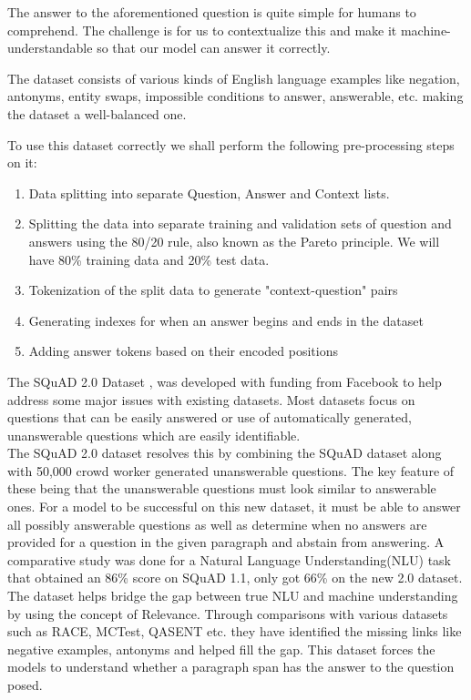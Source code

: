 \documentclass[a4paper,12pt]{report}
\begin{document}
	    The answer to the aforementioned question is quite simple for humans to comprehend. The challenge is for us to contextualize this and make it machine-understandable so that our model can answer it correctly.

	    The dataset consists of various kinds of English language examples like negation, antonyms, entity swaps, impossible conditions to answer, answerable, etc. making the dataset a well-balanced one.

	    To use this dataset correctly we shall perform the following pre-processing steps on it:

	    \begin{enumerate}
	    	\item Data splitting into separate Question, Answer and Context lists.
	    	\item Splitting the data into separate training and validation sets of  question and answers using the 80/20 rule, also known as the Pareto principle. We will have 80\% training data and 20\% test data.
	    	\item Tokenization of the split data to generate "context-question" pairs
	    	\item Generating indexes for when an answer begins and ends in the dataset
	    	\item Adding answer tokens based on their encoded positions
	    \end{enumerate}

        The SQuAD 2.0 Dataset \citep{dataset}, was developed with funding from Facebook to help address some major issues with existing datasets. Most datasets focus on questions that can be easily answered or use of    automatically generated, unanswerable questions which are easily identifiable.\\
        The SQuAD 2.0 dataset resolves this by combining the SQuAD dataset along with 50,000 crowd worker generated unanswerable questions. The key feature of these being that the unanswerable questions must look similar to answerable ones. For a model to be successful on this new dataset, it must be able to answer all possibly answerable questions as well as determine when no answers are provided for a question in the given paragraph and abstain from answering. A comparative study was done for a Natural Language Understanding(NLU) task that obtained an 86\% score on SQuAD 1.1, only got 66\% on the new 2.0 dataset.
        The dataset helps bridge the gap between true NLU and machine understanding by using the concept of Relevance. Through comparisons with various datasets such as RACE, MCTest, QASENT etc. they have identified the missing links like negative examples, antonyms and helped fill the gap. This dataset forces the models to understand whether a paragraph span has the answer to the question posed.
\end{document}
